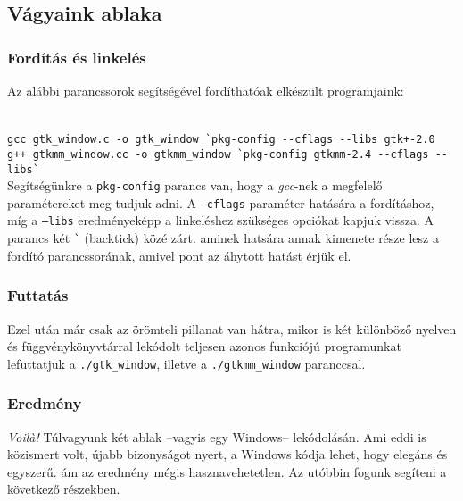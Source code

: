 \documentclass[a4paper,10pt]{article}
\begin{document}
\subsection{Vágyaink ablaka}

\subsubsection{Fordítás és linkelés}

Az alábbi parancssorok segítségével fordíthatóak elkészült programjaink:

\fontsize{8pt}{8pt}
\ \\
\texttt{gcc gtk\_window.c -o gtk\_window \`{}pkg-config {-}-cflags {-}-libs gtk+-2.0}
\ \\
\texttt{g++ gtkmm\_window.cc -o gtkmm\_window \`{}pkg-config gtkmm-2.4 {-}-cflags {-}-libs\`{}}
\\

Segítségünkre a \texttt{pkg-config} parancs van, hogy a \textit{gcc}-nek a megfelelő paramétereket meg tudjuk adni. A \texttt{--cflags} paraméter hatására a fordításhoz, míg a \texttt{--libs} eredményeképp a linkeléshez szükséges opciókat kapjuk vissza. A parancs két \texttt{\`} (backtick) közé zárt. aminek hatsára annak kimenete része lesz a fordító parancssorának, amivel pont az áhytott hatást érjük el.

\subsubsection{Futtatás}

Ezel után már csak az örömteli pillanat van hátra, mikor is két különböző nyelven és függvénykönyvtárral lekódolt teljesen azonos funkciójú programunkat lefuttatjuk a \texttt{./gtk\_window}, illetve a \texttt{./gtkmm\_window} paranccsal.

\subsubsection{Eredmény}

\textit{Voil\`{a}!} Túlvagyunk két ablak --vagyis egy Windows-- lekódolásán. Ami eddi is közismert volt, újabb bizonyságot nyert, a Windows kódja lehet, hogy elegáns és egyszerű. ám az eredmény mégis hasznavehetetlen. Az utóbbin fogunk segíteni a következő részekben.
\end{document}
